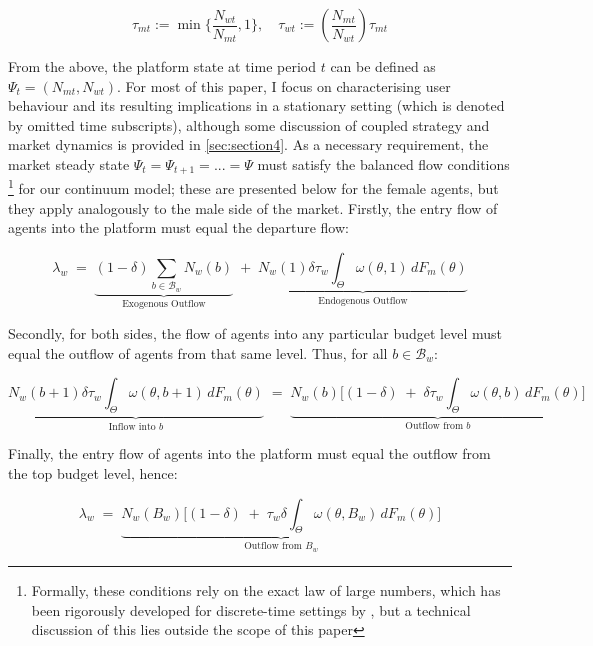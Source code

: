 \begin{equation*}
    \tau_{mt}:=\min \Big\{\frac{N_{wt}}{N_{mt}} ,1 \Big\}, \quad \tau_{wt}:= \left(\frac{N_{mt}}{N_{wt}}\right) \tau_{mt} 
\end{equation*}


From the above, the platform state at time period $t$ can be defined as $\Psi_t=(N_{mt},N_{wt})$. For most of this paper, I focus on characterising user behaviour and its resulting implications in a stationary setting (which is denoted by omitted time subscripts), although some discussion of coupled strategy and market dynamics is provided in \autoref{sec:section4}. As a necessary requirement, the market steady state $\Psi_t=\Psi_{t+1}=...=\Psi$ must satisfy the balanced flow conditions \footnote{Formally, these conditions rely on the exact law of large numbers, which has been rigorously developed for discrete-time settings by \cite{duffie2018dynamic}, but a technical discussion of this lies outside the scope of this paper} for our continuum model; these are presented below for the female agents, but they apply analogously to the male side of the market. Firstly, the entry flow of agents into the platform must equal the departure flow: 

\begin{equation}\label{eq:ss1} 
    \lambda_w\;=\; \underbrace{ (1-\delta)\sum_{b\in\mathcal{B}_w}N_w(b)}_{\text{Exogenous Outflow}} \;+\; \underbrace{N_w(1) \delta \tau_w\int_{\Theta}\omega(\theta,1)\,dF_{m}(\theta)}_{\text{Endogenous Outflow}} 
\end{equation} 

Secondly, for both sides, the flow of agents into any particular budget level must equal the outflow of agents from that same level. Thus, for all $b\in\mathcal{B}_w$: 

\begin{equation}\label{eq:ss2} 
    \underbrace{N_w(b+1) \delta \tau_w \int_{\Theta} \omega(\theta,b+1)\,dF_{m}(\theta)}_{\text{Inflow into $b$}} \;=\; \underbrace{N_w(b) \Big[ (1-\delta) \;+\; \delta \tau_w\int_{\Theta} \omega(\theta,b)\,dF_{m}(\theta)\Big]}_{\text{Outflow from $b$}}
\end{equation}

Finally, the entry flow of agents into the platform must equal the outflow from the top budget level, hence:

\begin{equation}\label{eq:ss3} 
    \lambda_w \;=\; \underbrace{N_w(B_w) \Big[ (1-\delta) \;+\; \tau_w \delta \int_{\Theta} \omega(\theta,B_w)\,dF_{m}(\theta) \Big]}_{\text{Outflow from $B_w$}}
\end{equation} 

